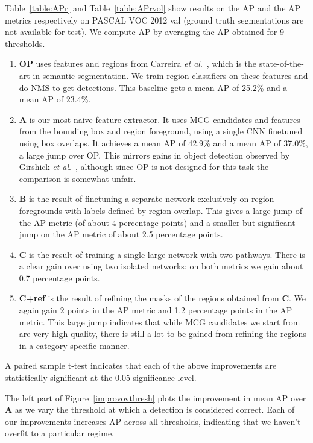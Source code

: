 \documentclass[runningheads]{llncs}
\newcommand\etal{\emph{et al}.\ }
\newcommand\methodA{\textbf{A}}
\newcommand\methodB{\textbf{B}}
\newcommand\methodC{\textbf{C}}
\begin{document}
Table~\ref{table:APr} and Table~\ref{table:APrvol} show results on the AP and the AP metrics respectively on PASCAL VOC 2012 val (ground truth segmentations are not available for test). We compute AP by averaging the AP obtained for 9 thresholds. 
\begin{enumerate}
\item \textbf{OP} uses features and regions from Carreira \etal\cite{CarreiraECCV12}, which is the state-of-the-art in semantic segmentation. We train region classifiers on these features and do NMS to get detections. This baseline gets a mean AP of 25.2\% and a mean AP of 23.4\%. 
\item \textbf{\methodA{}} is our most naive feature extractor. It uses MCG candidates and features from the bounding box and region foreground, using a single CNN finetuned using box overlaps. It achieves a mean AP of 42.9\% and a mean AP of 37.0\%, a large jump over OP. This mirrors gains in object detection observed by Girshick \etal\cite{GirshickCVPR14}, although since OP is not designed for this task the comparison is somewhat unfair. 
\item \textbf{\methodB{}} is the result of finetuning a separate network exclusively on region foregrounds with labels defined by region overlap. This gives a large jump of the AP metric (of about 4 percentage points) and a smaller but significant jump on the AP metric of about 2.5 percentage points. 
\item \textbf{\methodC{}} is the result of training a single large network with two pathways. There is a clear gain over using two isolated networks: on both metrics we gain about 0.7 percentage points.
\item \textbf{\methodC{}+ref} is the result of refining the masks of the regions obtained from \methodC{}. We again gain 2 points in the AP metric and 1.2 percentage points in the AP metric. This large jump indicates that while MCG candidates we start from are very high quality, there is still a lot to be gained from refining the regions in a category specific manner.
\end{enumerate}
A paired sample t-test indicates that each of the above improvements are statistically significant at the 0.05 significance level.

The left part of Figure~\ref{improvovthresh} plots the improvement in mean AP over \methodA{}  as we vary the threshold at which a detection is considered correct. Each of our improvements increases AP across all thresholds, indicating that we haven't overfit to a particular regime.
\end{document}
